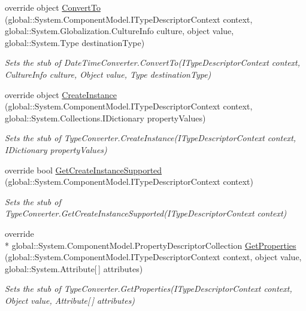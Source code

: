 \begin{DoxyCompactItemize}
override object \hyperlink{class_system_1_1_component_model_1_1_fakes_1_1_stub_date_time_converter_a97a191e7fe2a707f9ffe434de45780d9}{Convert\-To} (global\-::\-System.\-Component\-Model.\-I\-Type\-Descriptor\-Context context, global\-::\-System.\-Globalization.\-Culture\-Info culture, object value, global\-::\-System.\-Type destination\-Type)
\begin{DoxyCompactList}\small\item\em Sets the stub of Date\-Time\-Converter.\-Convert\-To(\-I\-Type\-Descriptor\-Context context, Culture\-Info culture, Object value, Type destination\-Type)\end{DoxyCompactList}\item 
override object \hyperlink{class_system_1_1_component_model_1_1_fakes_1_1_stub_date_time_converter_acc515a67417ae5ac25f24a7c32f23179}{Create\-Instance} (global\-::\-System.\-Component\-Model.\-I\-Type\-Descriptor\-Context context, global\-::\-System.\-Collections.\-I\-Dictionary property\-Values)
\begin{DoxyCompactList}\small\item\em Sets the stub of Type\-Converter.\-Create\-Instance(\-I\-Type\-Descriptor\-Context context, I\-Dictionary property\-Values)\end{DoxyCompactList}\item 
override bool \hyperlink{class_system_1_1_component_model_1_1_fakes_1_1_stub_date_time_converter_a8f9f11db90ae963517610b1f27f9e793}{Get\-Create\-Instance\-Supported} (global\-::\-System.\-Component\-Model.\-I\-Type\-Descriptor\-Context context)
\begin{DoxyCompactList}\small\item\em Sets the stub of Type\-Converter.\-Get\-Create\-Instance\-Supported(\-I\-Type\-Descriptor\-Context context)\end{DoxyCompactList}\item 
override \\*
global\-::\-System.\-Component\-Model.\-Property\-Descriptor\-Collection \hyperlink{class_system_1_1_component_model_1_1_fakes_1_1_stub_date_time_converter_a47ae2864b76b0e96a09d8f86e10a16b6}{Get\-Properties} (global\-::\-System.\-Component\-Model.\-I\-Type\-Descriptor\-Context context, object value, global\-::\-System.\-Attribute\mbox{[}$\,$\mbox{]} attributes)
\begin{DoxyCompactList}\small\item\em Sets the stub of Type\-Converter.\-Get\-Properties(\-I\-Type\-Descriptor\-Context context, Object value, Attribute\mbox{[}$\,$\mbox{]} attributes)\end{DoxyCompactList}\item 

\end{DoxyCompactItemize}
